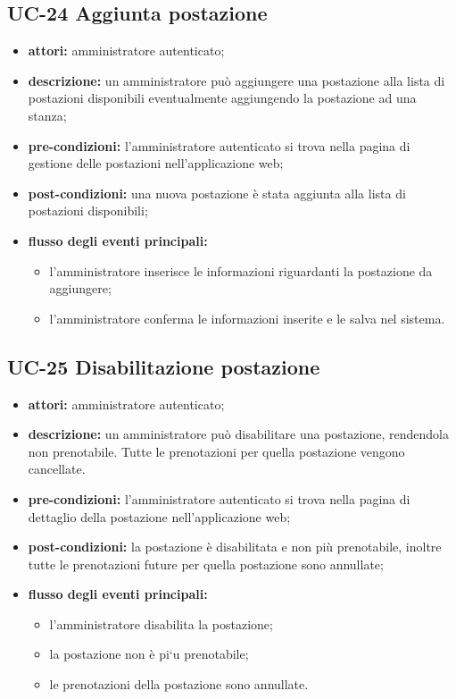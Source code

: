 \subsection{UC-24 Aggiunta postazione}
\begin{itemize}
    \item \textbf{attori:} amministratore autenticato;
    \item \textbf{descrizione:} un amministratore pu\`{o} aggiungere una postazione alla lista di postazioni disponibili eventualmente aggiungendo la postazione ad una stanza;
    \item \textbf{pre-condizioni:} l'amministratore autenticato si trova nella pagina di gestione delle postazioni nell'applicazione web;
    \item \textbf{post-condizioni:} una nuova postazione \`{e} stata aggiunta alla lista di postazioni disponibili;
    \item \textbf{flusso degli eventi principali:}
    \begin{itemize}
        \item l'amministratore inserisce le informazioni riguardanti la postazione da aggiungere;
        \item l'amministratore conferma le informazioni inserite e le salva nel sistema.
    \end{itemize}
\end{itemize}


\subsection{UC-25 Disabilitazione postazione}
\begin{itemize}
    \item \textbf{attori:} amministratore autenticato;
    \item \textbf{descrizione:} un amministratore pu\`{o} disabilitare una postazione, rendendola non prenotabile. Tutte le prenotazioni per quella postazione vengono cancellate.
    \item \textbf{pre-condizioni:} l'amministratore autenticato si trova nella pagina di dettaglio della postazione nell'applicazione web;
    \item \textbf{post-condizioni:} la postazione \`{e} disabilitata e non pi\`{u} prenotabile, inoltre tutte le prenotazioni future per quella postazione sono annullate;
    \item \textbf{flusso degli eventi principali:}
    \begin{itemize}
        \item l'amministratore disabilita la postazione;
        \item la postazione non \`{e} pi`{u} prenotabile;
        \item le prenotazioni della postazione sono annullate.
    \end{itemize}
\end{itemize}


